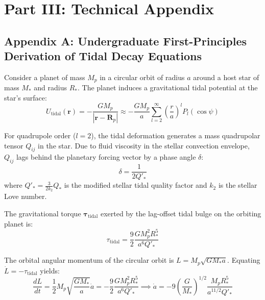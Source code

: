 \documentclass[11pt,a4paper]{article}
\begin{document}
\newpage

\section*{Part III: Technical Appendix}

\subsection*{Appendix A: Undergraduate First-Principles Derivation of Tidal Decay Equations}

Consider a planet of mass $M_p$ in a circular orbit of radius $a$ around a host star of mass $M_*$ and radius $R_*$. The planet induces a gravitational tidal potential at the star's surface:
\begin{equation}
U_{\text{tidal}}(\mathbf{r}) = -\frac{G M_p}{|\mathbf{r} - \mathbf{R}_p|} \approx -\frac{G M_p}{a} \sum_{l=2}^{\infty} \left(\frac{r}{a}\right)^l P_l(\cos \psi)
\end{equation}

For quadrupole order ($l=2$), the tidal deformation generates a mass quadrupolar tensor $Q_{ij}$ in the star. Due to fluid viscosity in the stellar convection envelope, $Q_{ij}$ lags behind the planetary forcing vector by a phase angle $\delta$:
\begin{equation}
\delta = \frac{1}{2 Q'_*}
\end{equation}
where $Q'_* = \frac{3}{2 k_2} Q_*$ is the modified stellar tidal quality factor and $k_2$ is the stellar Love number.

The gravitational torque $\mathbf{\tau}_{\text{tidal}}$ exerted by the lag-offset tidal bulge on the orbiting planet is:
\begin{equation}
\tau_{\text{tidal}} = \frac{9}{2} \frac{G M_p^2 R_*^5}{a^6 Q'_*}
\end{equation}

The orbital angular momentum of the circular orbit is $L = M_p \sqrt{G M_* a}$. Equating $\dot{L} = -\tau_{\text{tidal}}$ yields:
\begin{equation}
\frac{d L}{dt} = \frac{1}{2} M_p \sqrt{\frac{G M_*}{a}} \dot{a} = -\frac{9}{2} \frac{G M_p^2 R_*^5}{a^6 Q'_*} \implies \dot{a} = -9 \left(\frac{G}{M_*}\right)^{1/2} \frac{M_p R_*^5}{a^{11/2} Q'_*}
\end{equation}
\end{document}
